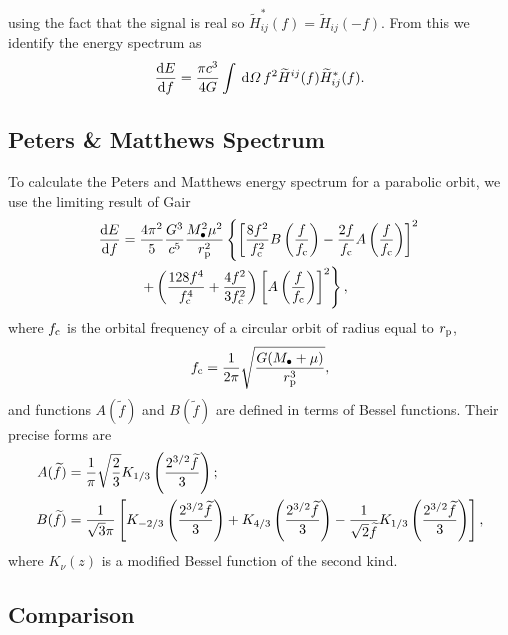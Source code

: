 using the fact that the signal is real so $\widetilde{H}_{ij}^*(f) = \widetilde{H}_{ij}(-f)$. From this we identify the energy spectrum as
\begin{align}
\frac{\mathrm{d} {E}}{\mathrm{d} {f}} = \frac{\pi c^3}{4 G} \int_{}^{}{}\,\mathrm{d}{\Omega} \, f^2 \widetilde{H}^{ij}(f)\widetilde{H}_{ij}^*(f).
\label{eq:NK_dEdf}
\end{align}

\subsection{Peters \& Matthews Spectrum}

To calculate the Peters and Matthews energy spectrum for a parabolic orbit, we use the limiting result of Gair\cite{Gair2010}
\begin{align}
\frac{\mathrm{d} {E}}{\mathrm{d} {f}} = {} & \frac{4\pi^2}{5}\frac{G^3}{c^5}\frac{M_\bullet^2\mu^2}{r_\mathrm{p}^2}\left\{\left[\frac{8f^2}{f_\mathrm{c}^2}B\left(\frac{f}{f_\mathrm{c}}\right) - \frac{2f}{f_\mathrm{c}}A\left(\frac{f}{f_\mathrm{c}}\right)\right]^2 \right. \nonumber \\
 & \left. + \left(\frac{128f^4}{f_\mathrm{c}^4} + \frac{4f^2}{3f_\mathrm{c}^2}\right)\left[A\left(\frac{f}{f_\mathrm{c}}\right)\right]^2\right\},
\label{eq:PM_dEdf}
\end{align}
where $f_\mathrm{c}$ is the orbital frequency of a circular orbit of radius equal to $r_\mathrm{p}$,
\begin{equation}
f_\mathrm{c} = \frac{1}{2\pi}\sqrt{\frac{G(M_\bullet + \mu)}{r_\mathrm{p}^3}},
\end{equation}
and functions $A(\widetilde{f})$ and $B(\widetilde{f})$ are defined in terms of Bessel functions. Their precise forms are
\begin{align}
A(\widetilde{f}) = {} & \frac{1}{\pi}\sqrt{\frac{2}{3}}K_{1/3}\left(\frac{2^{3/2}\widetilde{f}}{3}\right); \\
B(\widetilde{f}) = {} & \frac{1}{\sqrt{3}\pi}\left[K_{-2/3}\left(\frac{2^{3/2}\widetilde{f}}{3}\right) + K_{4/3}\left(\frac{2^{3/2}\widetilde{f}}{3}\right) - \frac{1}{\sqrt{2}\widetilde{f}}K_{1/3}\left(\frac{2^{3/2}\widetilde{f}}{3}\right)\right],
\end{align}
where $K_\nu(z)$ is a modified Bessel function of the second kind\cite{Watson1995}.

\subsection{Comparison}

